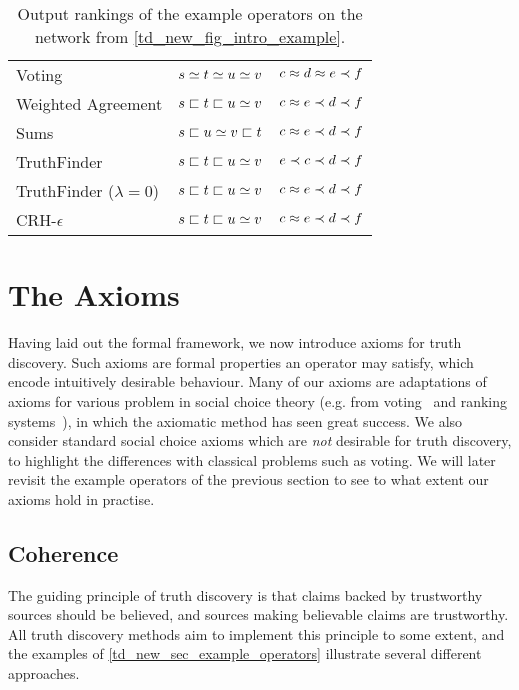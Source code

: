 \begin{table}
    \centering
	\caption{Output rankings of the example operators on the network from
    \cref{td_new_fig_intro_example}.}
	\begin{tabular}{lcc}
    \toprule
    Voting             & $s \simeq t \simeq u \simeq v$ & $c \approx d \approx e \prec f$ \\
    Weighted Agreement & $s \sqsubset t \sqsubset u \simeq v$ & $c \approx e \prec d \prec f$ \\
    Sums               & $s \sqsubset u \simeq v \sqsubset t$ & $c \approx e \prec d \prec f$ \\
    TruthFinder        & $s \sqsubset t \sqsubset u \simeq v$ & $e \prec c \prec d \prec f$ \\
    TruthFinder ($\lambda = 0$) & $s \sqsubset t \sqsubset u \simeq v$ & $c \approx e \prec d \prec f$ \\
    CRH-$\epsilon$     & $s \sqsubset t \sqsubset u \simeq v$ & $c \approx e \prec d \prec f$ \\
    \bottomrule
	\end{tabular}
    \label{td_new_tab_example_outputs}
\end{table}

\section{The Axioms}
\label{td_new_sec_axioms}

Having laid out the formal framework, we now introduce axioms for truth
discovery. Such axioms are formal properties an operator may satisfy, which
encode intuitively desirable behaviour. Many of our axioms are adaptations of
axioms for various problem in social choice theory (e.g. from
voting~\cite{zwicker2016voting} and ranking systems~\cite{altman2008}), in
which the axiomatic method has seen great success. We also consider standard
social choice axioms which are \emph{not} desirable for truth discovery, to
highlight the differences with classical problems such as voting. We will later
revisit the example operators of the previous section to see to what extent our
axioms hold in practise.

\subsection{Coherence}
\label{td_new_sec_coherence}

The guiding principle of truth discovery is that claims backed by trustworthy
sources should be believed, and sources making believable claims are
trustworthy. All truth discovery methods aim to implement this principle to
some extent, and the examples of \cref{td_new_sec_example_operators} illustrate
several different approaches.

